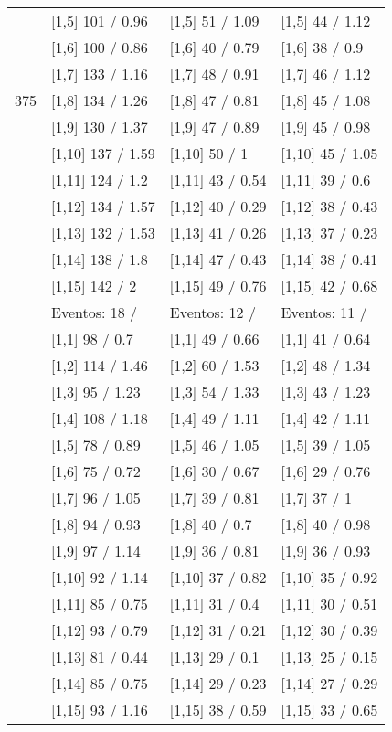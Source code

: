 \begin{table}
\begin{tabular}[t]{llll}
 & {}[1,5] 101  / 0.96 & {}[1,5] 51  / 1.09 & {}[1,5] 44  / 1.12\\
 & {}[1,6] 100  / 0.86 & {}[1,6] 40  / 0.79 & {}[1,6] 38  / 0.9\\
 & {}[1,7] 133  / 1.16 & {}[1,7] 48  / 0.91 & {}[1,7] 46  / 1.12\\
375 & {}[1,8] 134  / 1.26 & {}[1,8] 47  / 0.81 & {}[1,8] 45  / 1.08\\
\addlinespace
 & {}[1,9] 130  / 1.37 & {}[1,9] 47  / 0.89 & {}[1,9] 45  / 0.98\\
 & {}[1,10] 137  / 1.59 & {}[1,10] 50  / 1 & {}[1,10] 45  / 1.05\\
 & {}[1,11] 124  / 1.2 & {}[1,11] 43  / 0.54 & {}[1,11] 39  / 0.6\\
 & {}[1,12] 134  / 1.57 & {}[1,12] 40  / 0.29 & {}[1,12] 38  / 0.43\\
 & {}[1,13] 132  / 1.53 & {}[1,13] 41  / 0.26 & {}[1,13] 37  / 0.23\\
\addlinespace
 & {}[1,14] 138  / 1.8 & {}[1,14] 47  / 0.43 & {}[1,14] 38  / 0.41\\
 & {}[1,15] 142  / 2 & {}[1,15] 49  / 0.76 & {}[1,15] 42  / 0.68\\
 & Eventos:  18 / & Eventos:  12 / & Eventos:  11 /\\
 & {}[1,1] 98  / 0.7 & {}[1,1] 49  / 0.66 & {}[1,1] 41  / 0.64\\
 & {}[1,2] 114  / 1.46 & {}[1,2] 60  / 1.53 & {}[1,2] 48  / 1.34\\
\addlinespace
 & {}[1,3] 95  / 1.23 & {}[1,3] 54  / 1.33 & {}[1,3] 43  / 1.23\\
 & {}[1,4] 108  / 1.18 & {}[1,4] 49  / 1.11 & {}[1,4] 42  / 1.11\\
 & {}[1,5] 78  / 0.89 & {}[1,5] 46  / 1.05 & {}[1,5] 39  / 1.05\\
 & {}[1,6] 75  / 0.72 & {}[1,6] 30  / 0.67 & {}[1,6] 29  / 0.76\\
 & {}[1,7] 96  / 1.05 & {}[1,7] 39  / 0.81 & {}[1,7] 37  / 1\\
\addlinespace
500 & {}[1,8] 94  / 0.93 & {}[1,8] 40  / 0.7 & {}[1,8] 40  / 0.98\\
 & {}[1,9] 97  / 1.14 & {}[1,9] 36  / 0.81 & {}[1,9] 36  / 0.93\\
 & {}[1,10] 92  / 1.14 & {}[1,10] 37  / 0.82 & {}[1,10] 35  / 0.92\\
 & {}[1,11] 85  / 0.75 & {}[1,11] 31  / 0.4 & {}[1,11] 30  / 0.51\\
 & {}[1,12] 93  / 0.79 & {}[1,12] 31  / 0.21 & {}[1,12] 30  / 0.39\\
\addlinespace
 & {}[1,13] 81  / 0.44 & {}[1,13] 29  / 0.1 & {}[1,13] 25  / 0.15\\
 & {}[1,14] 85  / 0.75 & {}[1,14] 29  / 0.23 & {}[1,14] 27  / 0.29\\
 & {}[1,15] 93  / 1.16 & {}[1,15] 38  / 0.59 & {}[1,15] 33  / 0.65\\
\bottomrule
\end{tabular}
\end{table}
